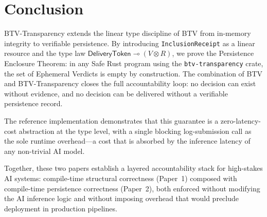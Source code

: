 \section{Conclusion}
\label{sec:conclusion}

BTV-Transparency extends the linear type discipline of BTV from in-memory
integrity to verifiable persistence. By introducing \texttt{InclusionReceipt}
as a linear resource and the type law
$\mathsf{DeliveryToken} \multimap (V \otimes R)$, we prove the Persistence
Enclosure Theorem: in any Safe Rust program using the \texttt{btv-transparency}
crate, the set of Ephemeral Verdicts is empty by construction. The
combination of BTV and BTV-Transparency closes the full accountability loop:
no decision can exist without evidence, and no decision can be delivered
without a verifiable persistence record.

The reference implementation demonstrates that this guarantee is a
zero-latency-cost abstraction at the type level, with a single blocking
log-submission call as the sole runtime overhead---a cost that is absorbed
by the inference latency of any non-trivial AI model.

Together, these two papers establish a layered accountability stack for
high-stakes AI systems: compile-time structural correctness (Paper~1) composed
with compile-time persistence correctness (Paper~2), both enforced without
modifying the AI inference logic and without imposing overhead that would
preclude deployment in production pipelines.
